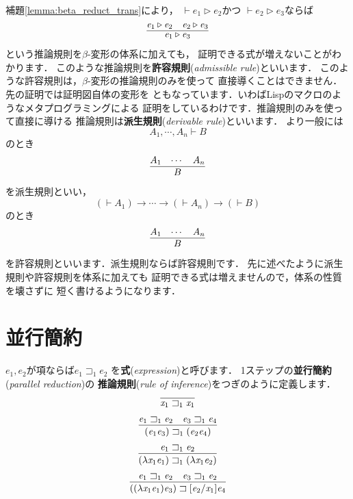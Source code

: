 \documentclass{ltjsbook}%
\newcommand\lemmaname{補題}%
\newcommand\term[2]{\textbf{#1}{(\textit{#2})}}%
\begin{document}
\lemmaname\ref{lemma:beta_reduct_trans}により，%
$\vdash\mathit{e}_1\triangleright\mathit{e}_2$かつ%
$\vdash\mathit{e}_2\triangleright\mathit{e}_3$ならば%
\begin{equation}%
  \infer{%
    \mathit{e}_1\triangleright\mathit{e}_3%
  }{%
    \mathit{e}_1\triangleright\mathit{e}_2%
  &%
    \mathit{e}_2\triangleright\mathit{e}_3%
  }%
\end{equation}%
という推論規則を$\beta$-変形の体系に加えても，%
証明できる式が増えないことがわかります．%
このような推論規則を\term{許容規則}{admissible rule}といいます．%
このような許容規則は，$\beta$-変形の推論規則のみを使って%
直接導くことはできません．先の証明では証明図自体の変形を%
ともなっています．いわばLispのマクロのようなメタプログラミングによる%
証明をしているわけです．推論規則のみを使って直接に導ける%
推論規則は\term{派生規則}{derivable rule}といいます．%
より一般には%
\begin{equation}%
  A_1,\cdots,A_n\vdash B%
\end{equation}%
のとき%
\begin{equation}%
  \infer{%
    B%
  }{%
    A_1&\cdots&A_n%
  }%
\end{equation}%
を派生規則といい，%
\begin{equation}%
  (\vdash A_1)\rightarrow\cdots\rightarrow(\vdash A_n)\rightarrow(\vdash B)%
\end{equation}%
のとき%
\begin{equation}%
  \infer{%
    B%
  }{%
    A_1&\cdots&A_n%
  }%
\end{equation}%
を許容規則といいます．派生規則ならば許容規則です．%
先に述べたように派生規則や許容規則を体系に加えても%
証明できる式は増えませんので，体系の性質を壊さずに%
短く書けるようになります．%
\section{並行簡約}%
\label{sect:par}%
$\mathit{e}_1,\mathit{e}_2$が項ならば$\mathit{e}_1\sqsupset_1\mathit{e}_2$%
を\term{式}{expression}と呼びます．%
1ステップの\term{並行簡約}{parallel reduction}の%
\term{推論規則}{rule of inference}をつぎのように定義します．%
\begin{equation}%
  \infer{%
    \mathit{x}_1\sqsupset_1\mathit{x}_1%
  }{%
  }%
\end{equation}%
\begin{equation}%
  \infer{%
    (\mathit{e}_1\mathit{e}_3)\sqsupset_1(\mathit{e}_2\mathit{e}_4)%
  }{%
    \mathit{e}_1\sqsupset_1\mathit{e}_2%
  &%
    \mathit{e}_3\sqsupset_1\mathit{e}_4%
  }%
\end{equation}%
\begin{equation}%
  \infer{%
    (\lambda\mathit{x}_1\mathit{e}_1)\sqsupset_1%
    (\lambda\mathit{x}_1\mathit{e}_2)%
  }{%
    \mathit{e}_1\sqsupset_1\mathit{e}_2%
  }%
\end{equation}%
\begin{equation}%
  \infer{%
    ((\lambda\mathit{x}_1\mathit{e}_1)\mathit{e}_3)\sqsupset%
    [\mathit{e}_2/\mathit{x}_1]\mathit{e}_4%
  }{%
    \mathit{e}_1\sqsupset_1\mathit{e}_2%
  &%
    \mathit{e}_3\sqsupset_1\mathit{e}_2%
  }%
\end{equation}%
\end{document}
